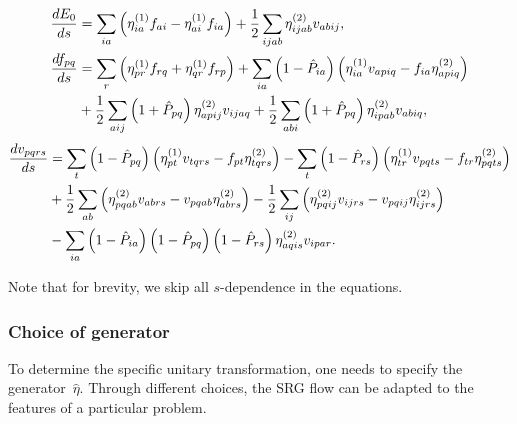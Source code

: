 \documentclass[amsmath, amssymb, aps, floatfix, nofootinbib, preprintnumbers,showpacs, superscriptaddress, twocolumn]{revtex4-1}
\newcommand{\lb}{\left(}
\newcommand{\rb}{\right)}
\begin{document}
\begin{widetext}
\begin{align}
\frac{d E_0}{ds} &= \sum_{ia}\left( \eta_{ia}^{(1)}f_{ai} -
\eta_{ai}^{(1)}f_{ia}\right) +
\frac{1}{2}\sum_{ijab}\eta_{ijab}^{(2)}v_{abij},
\label{eq:flow1}\\
\frac{d f_{pq}}{ds}&= \sum_r \lb \eta_{pr}^{(1)}f_{rq} +
\eta_{qr}^{(1)}f_{rp}\right) + \sum_{ia}\lb 1-\hat{P}_{ia}\rb \lb
\eta_{ia}^{(1)}v_{apiq} - f_{ia}\eta_{apiq}^{(2)} \rb \notag \\ &
+\frac{1}{2} \sum_{aij} \lb 1+\hat{P}_{pq}\rb
\eta_{apij}^{(2)}v_{ijaq} + \frac{1}{2}\sum_{abi}\lb 1+\hat{P}_{pq}\rb
\eta_{ipab}^{(2)}v_{abiq},
\label{eq:flow2}
\end{align}
\begin{align}
\frac{d v_{pqrs}}{ds} &= \sum_t \lb 1-\hat{P}_{pq} \rb \lb
\eta_{pt}^{(1)}v_{tqrs}-f_{pt}\eta_{tqrs}^{(2)}\rb -\sum_t \lb
1-\hat{P}_{rs} \rb \lb \eta_{tr}^{(1)} v_{pqts} - f_{tr}
\eta_{pqts}^{(2)}\rb \notag \\ & +\frac{1}{2}\sum_{ab}
\lb\eta_{pqab}^{(2)} v_{abrs} - v_{pqab}\eta_{abrs}^{(2)}\rb -
\frac{1}{2}\sum_{ij} \lb\eta_{pqij}^{(2)} v_{ijrs} -
v_{pqij}\eta_{ijrs}^{(2)}\rb \notag \\ & -\sum_{ia} \lb 1-
\hat{P}_{ia} \rb \lb 1-\hat{P}_{pq}\rb \lb 1-\hat{P}_{rs} \rb
\eta_{aqis}^{(2)}v_{ipar}.
\label{eq:flow3}
\end{align}
\end{widetext}
Note that for brevity, we skip all $s$-dependence in the equations.

\subsubsection*{Choice of generator}
To determine the specific unitary transformation, one needs to specify
the generator~$\hat{\eta}$. Through different choices, the SRG flow
can be adapted to the features of a particular problem.\\
\end{document}
